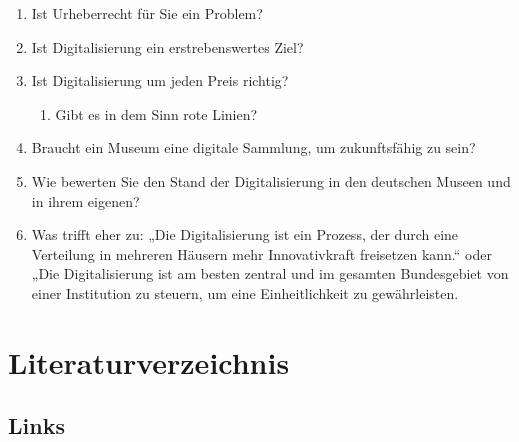 \documentclass[a4paper,12pt,ngerman]{article}
\begin{document}
\begin{enumerate}
\begin{enumerate}
\end{enumerate}
\item Ist Urheberrecht für Sie ein Problem?
\item Ist Digitalisierung ein erstrebenswertes Ziel?
\item Ist Digitalisierung um jeden Preis richtig?
\begin{enumerate}
\item Gibt es in dem Sinn rote Linien?
\end{enumerate}
\item Braucht ein Museum eine digitale Sammlung, um zukunftsfähig zu sein?
\item Wie bewerten Sie den Stand der Digitalisierung in den deutschen Museen und in ihrem eigenen?
\item Was trifft eher zu: „Die Digitalisierung ist ein Prozess, der durch eine Verteilung in mehreren Häusern mehr Innovativkraft freisetzen kann.“ oder „Die Digitalisierung ist am besten zentral und im gesamten Bundesgebiet von einer Institution zu steuern, um eine Einheitlichkeit zu gewährleisten.
\end{enumerate}

\newpage
\section{Literaturverzeichnis}
\subsection{Links}
\end{document}
